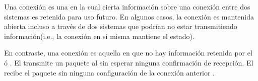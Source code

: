 Una conexión \stateful es una en la cual cierta información sobre una conexión entre dos sistemas es retenida para uso futuro. En algunos casos, la conexión es mantenida abierta incluso a través de dos sistemas que podrían no estar transmitiendo información(i.e., la conexión en si misma mantiene el estado)\cite{online_connection_stateful_stateless}.

En contraste, una conexión \stateless es aquella en que no hay información retenida por el \senderINT ó \receiverINT. El \senderINT transmite un paquete al \receiverINT sin esperar ninguna confirmación de recepción. El \receiverINT recibe el paquete sin ninguna configuración de la conexión anterior  \cite{online_connection_stateful_stateless}.


		